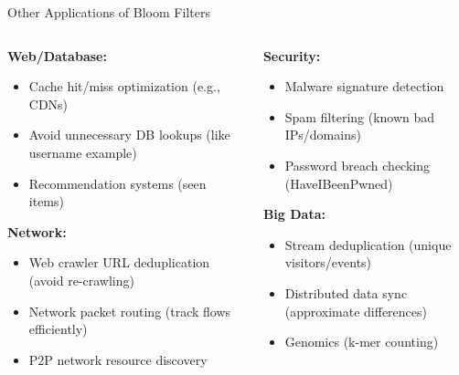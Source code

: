 \begin{frame}{Other Applications of Bloom Filters}
  \vspace{0.2cm}
  \begin{columns}
    \begin{column}{0.5\textwidth}
      \textbf{Web/Database:}
      \begin{itemize}
        \item Cache hit/miss optimization (e.g., CDNs)
        \item Avoid unnecessary DB lookups (like username example)
        \item Recommendation systems (seen items) \parencite{im/1109191032}
      \end{itemize}

      \textbf{Network:}
      \begin{itemize}
        \item Web crawler URL deduplication (avoid re-crawling)
        \item Network packet routing (track flows efficiently)
        \item P2P network resource discovery
      \end{itemize}
    \end{column}
    \begin{column}{0.5\textwidth}
      \textbf{Security:}
      \begin{itemize}
        \item Malware signature detection
        \item Spam filtering (known bad IPs/domains)
        \item Password breach checking (HaveIBeenPwned)
      \end{itemize}

      \textbf{Big Data:}
      \begin{itemize}
        \item Stream deduplication (unique visitors/events)
        \item Distributed data sync (approximate differences)
        \item Genomics (k-mer counting)
      \end{itemize}
    \end{column}
  \end{columns}
\end{frame}

